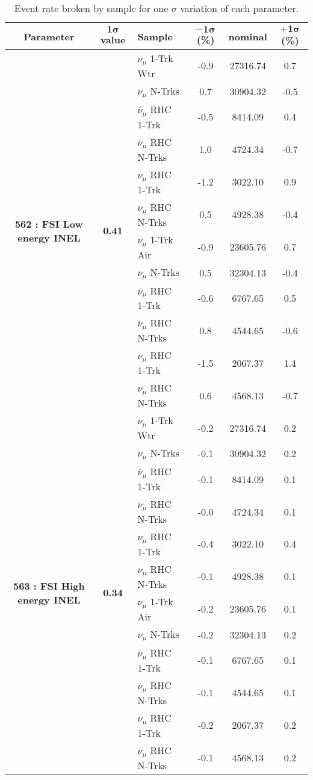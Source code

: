 \begin{table}[ht!]
\centering
\begin{tabular}{ c  c  l  c  c  c }
\midrule[1.3pt]
\textbf{Parameter} & \textbf{$\mathbf{1\sigma}$ value} & \textbf{Sample} & \textbf{$\mathbf{-1\sigma}$ (\%)}  &  \textbf{nominal}  &  \textbf{$\mathbf{+1\sigma}$ (\%)} \\
\midrule[1.3pt]
\multirow{12}{*}{\textbf{562 : FSI Low energy INEL}} & \multirow{12}{*}{\textbf{0.41}} & $\nu_\mu$ 1-Trk Wtr &   -0.9 &  27316.74 &   0.7 \\ 
 &  & $\nu_\mu$ N-Trks &   0.7 &  30904.32 &   -0.5 \\ 
 &  & $\overline{\nu}_\mu$ RHC 1-Trk &   -0.5 &  8414.09 &   0.4 \\ 
 &  & $\overline{\nu}_\mu$ RHC N-Trks &   1.0 &  4724.34 &   -0.7 \\ 
 &  & $\nu_\mu$ RHC 1-Trk &   -1.2 &  3022.10 &   0.9 \\ 
 &  & $\nu_\mu$ RHC N-Trks &   0.5 &  4928.38 &   -0.4 \\ 
 &  & $\nu_\mu$ 1-Trk Air &   -0.9 &  23605.76 &   0.7 \\ 
 &  & $\nu_\mu$ N-Trks &   0.5 &  32304.13 &   -0.4 \\ 
 &  & $\overline{\nu}_\mu$ RHC 1-Trk &   -0.6 &  6767.65 &   0.5 \\ 
 &  & $\overline{\nu}_\mu$ RHC N-Trks &   0.8 &  4544.65 &   -0.6 \\ 
 &  & $\nu_\mu$ RHC 1-Trk &   -1.5 &  2067.37 &   1.4 \\ 
 &  & $\nu_\mu$ RHC N-Trks &   0.6 &  4568.13 &   -0.7 \\ 
\midrule[1.3pt]
\multirow{12}{*}{\textbf{563 : FSI High energy INEL}} & \multirow{12}{*}{\textbf{0.34}} & $\nu_\mu$ 1-Trk Wtr &   -0.2 &  27316.74 &   0.2 \\ 
 &  & $\nu_\mu$ N-Trks &   -0.1 &  30904.32 &   0.2 \\ 
 &  & $\overline{\nu}_\mu$ RHC 1-Trk &   -0.1 &  8414.09 &   0.1 \\ 
 &  & $\overline{\nu}_\mu$ RHC N-Trks &   -0.0 &  4724.34 &   0.1 \\ 
 &  & $\nu_\mu$ RHC 1-Trk &   -0.4 &  3022.10 &   0.4 \\ 
 &  & $\nu_\mu$ RHC N-Trks &   -0.1 &  4928.38 &   0.1 \\ 
 &  & $\nu_\mu$ 1-Trk Air &   -0.2 &  23605.76 &   0.1 \\ 
 &  & $\nu_\mu$ N-Trks &   -0.2 &  32304.13 &   0.2 \\ 
 &  & $\overline{\nu}_\mu$ RHC 1-Trk &   -0.1 &  6767.65 &   0.1 \\ 
 &  & $\overline{\nu}_\mu$ RHC N-Trks &   -0.1 &  4544.65 &   0.1 \\ 
 &  & $\nu_\mu$ RHC 1-Trk &   -0.2 &  2067.37 &   0.2 \\ 
 &  & $\nu_\mu$ RHC N-Trks &   -0.1 &  4568.13 &   0.2 \\ 
\midrule[1.3pt]
\end{tabular}
\centering
\caption{Event rate broken by sample for one $\sigma$ variation of each parameter.}
\end{table}

